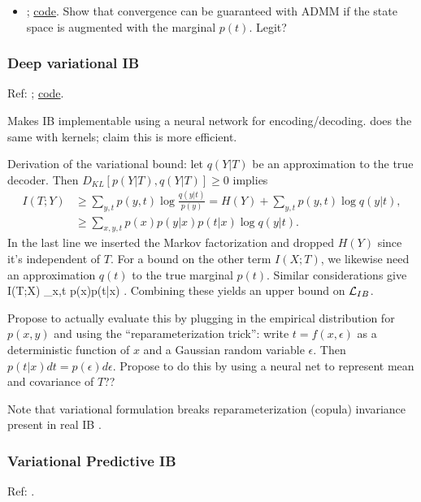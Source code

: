 \documentclass[notitlepage,openany,11pt]{report}
\theoremstyle{plain}%
\numberwithin{equation}{section}
\begin{document}
\begin{itemize}
\item \cite{HuangGamal:21}; \href{https://github.com/hui811116/ib-admm}{code}. Show that convergence can be guaranteed with ADMM if the state space is augmented with the marginal $p(t)$. Legit?
\end{itemize}

\subsubsection{Deep variational IB} 
Ref: \cite{AlemiEtAl:16}; \href{https://github.com/alexalemi/vib_demo}{code}.

Makes IB implementable using a neural network for encoding/decoding. \cite{ChalkEtAl:16} does the same with kernels; claim this is more efficient.

Derivation of the variational bound: let $q(Y|T)$ be an approximation to the true decoder. Then $D_{KL}[p(Y|T), q(Y|T)] \geq 0$ implies
\begin{align*}
I(T;Y) &\geq \sum_{y,t} p(y,t) \log \frac{q(y|t)}{p(y)} = H(Y) + \sum_{y,t} p(y,t) \log q(y|t), \\
{} &\geq \sum_{x,y,t} p(x)p(y|x) p(t|x) \log q(y|t).
\end{align*}
In the last line we inserted the Markov factorization and dropped $H(Y)$ since it's independent of $T$. For a bound on the other term $I(X;T)$, we likewise need an approximation $q(t)$ to the true marginal $p(t)$. Similar considerations give 
\be
I(T;X) \leq \sum_{x,t} p(x)p(t|x) \log {}.
\ee
Combining these yields an upper bound on $\mathcal{L}_{IB}$. 

Propose to actually evaluate this by plugging in the empirical distribution for $p(x,y)$  and using the ``reparameterization trick'': write $t=f(x,\epsilon)$ as a deterministic function of $x$ and a Gaussian random variable $\epsilon$. Then $p(t|x)dt = p(\epsilon)d\epsilon$. Propose to do this by using a neural net to represent mean and covariance of $T$??

Note that variational formulation breaks reparameterization (copula) invariance present in real IB \cite{WieczorekEtAl:18,WieczorekRoth:20}.


\subsubsection{Variational Predictive IB} 
Ref: \cite{Alemi:20}.
\end{document}
